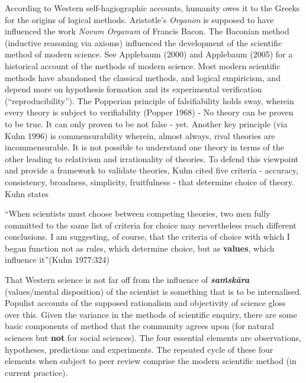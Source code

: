 According to Western self-hagiographic accounts, humanity owes it to the Greeks for the origins of logical methods. Aristotle's {\sl Organon} is supposed to have influenced the work {\sl Novum Organum} of Francis Bacon.  The Baconian method (inductive reasoning via axioms) influenced the development of the scientific method of modern science. See Applebaum (2000) and Applebaum (2005) for a historical account of the methods of modern science. Most modern scientific methods have abandoned the classical methods, and logical empiricism, and depend more on hypothesis formation and its experimental verification (``reproducibility''). The Popperian principle of falsifiability holds sway, wherein every theory is subject to verifiability (Popper 1968) - No theory can be proven to be true. It can only proven to be not false - yet.  Another key principle (via Kuhn 1996) is commensurability wherein, almost always, rival theories are incommensurable. It is not possible to understand one theory in terms of the other leading to relativism and irrationality of theories. To defend this viewpoint and provide a framework to validate theories, Kuhn cited five criteria - accuracy, consistency, broadness, simplicity, fruitfulness - that determine choice of theory. Kuhn states
\begin{myquote}
``When scientists must choose between competing theories, two men fully committed to the same list of criteria for choice may nevertheless reach different conclusions. I am suggesting, of course, that the criteria of choice with which I began function not as rules, which determine choice, but as {\bf values}, which influence it''\hfill (Kuhn 1977:324)
\end{myquote}

That Western science is not far off from the influence of {{\sl\bfseries saṁskāra}\relax} (values/mental disposition) of the scientist is something that is to be internalised. Populist accounts of the supposed rationalism and objectivity of science gloss over this. Given the variance in the methods of scientific enquiry, there are some basic components of method that the community agrees upon (for natural sciences but {\bf not} for social sciences). The four essential elements are observations, hypotheses, predictions and experiments. The repeated cycle of these four elements when subject to peer review comprise the modern scientific method (in current practice).

